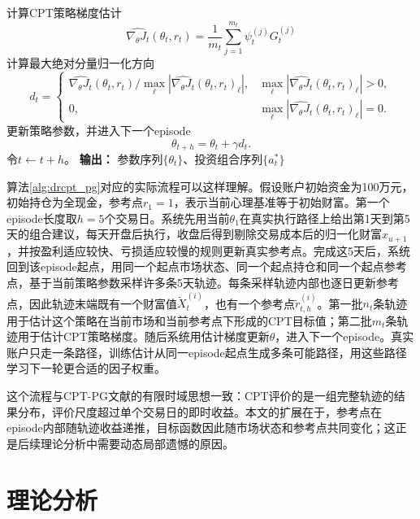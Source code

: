 \begin{algorithm}[H]
\begin{algorithmic}[1]
    \STATE 计算CPT策略梯度估计
    \begin{equation*}
    \widehat{\nabla_\theta J_t}(\theta_{t},r_t)
    =
    \frac{1}{m_t}
    \sum_{j=1}^{m_t}
    \psi_t^{(j)}
    G_t^{(j)}
    \end{equation*}
    \STATE 计算最大绝对分量归一化方向
    \begin{equation*}
    d_t
    =
    \begin{cases}
    \widehat{\nabla_\theta J_t}(\theta_t,r_t)/\max_\ell\left|\widehat{\nabla_\theta J_t}(\theta_t,r_t)_\ell\right|, & \max_\ell\left|\widehat{\nabla_\theta J_t}(\theta_t,r_t)_\ell\right|>0,\\[4pt]
    0, & \max_\ell\left|\widehat{\nabla_\theta J_t}(\theta_t,r_t)_\ell\right|=0.
    \end{cases}
    \end{equation*}
    \STATE 更新策略参数，并进入下一个episode
    \begin{equation*}
    \theta_{t+h}
    =
    \theta_t+\gamma d_t.
    \end{equation*}
    \STATE 令$t\leftarrow t+h$。
\ENDWHILE
\STATE \textbf{输出：} 参数序列$\{\theta_t\}$、投资组合序列$\{a_t^*\}$
\end{algorithmic}
\end{algorithm}

算法\ref{alg:drcpt_pg}对应的实际流程可以这样理解。假设账户初始资金为100万元，初始持仓为全现金，参考点$r_1=1$，表示当前心理基准等于初始财富。第一个episode长度取$h=5$个交易日。系统先用当前$\theta_1$在真实执行路径上给出第1天到第5天的组合建议，每天开盘后执行，收盘后得到剔除交易成本后的归一化财富$x_{u+1}$，并按盈利适应较快、亏损适应较慢的规则更新真实参考点。完成这5天后，系统回到该episode起点，用同一个起点市场状态、同一个起点持仓和同一个起点参考点，基于当前策略参数采样许多条5天轨迹。每条采样轨迹内部也逐日更新参考点，因此轨迹末端既有一个财富值$\widetilde X_t^{(i)}$，也有一个参考点$\widetilde r_{t,h}^{(i)}$。第一批$n_t$条轨迹用于估计这个策略在当前市场和当前参考点下形成的CPT目标值；第二批$m_t$条轨迹用于估计CPT策略梯度。随后系统用估计梯度更新$\theta$，进入下一个episode。真实账户只走一条路径，训练估计从同一episode起点生成多条可能路径，用这些路径学习下一轮更合适的因子权重。

这个流程与CPT-PG文献的有限时域思想一致：CPT评价的是一组完整轨迹的结果分布，评价尺度超过单个交易日的即时收益\citep{prashanth2016cumulative,lepel2026policygradients}。本文的扩展在于，参考点在episode内部随轨迹收益递推，目标函数因此随市场状态和参考点共同变化；这正是后续理论分析中需要动态局部遗憾的原因。
\chapter{理论分析}
